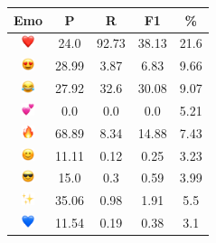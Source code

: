 \documentclass{article}
\begin{document}
\begin{table}
\centering
\begin{tabular}{|c|ccc|c|} \hline
\textbf{Emo} & \textbf{P} & \textbf{R} & \textbf{F1} & \textbf{\%} \\ \hline
\includegraphics[height=0.37cm,width=0.37cm]{img/red_heart.png} & 24.0 & 92.73 & 38.13 & 21.6\\ 
\includegraphics[height=0.37cm,width=0.37cm]{img/smiling_face_with_hearteyes.png} & 28.99 & 3.87 & 6.83 & 9.66\\ 
\includegraphics[height=0.37cm,width=0.37cm]{img/face_with_tears_of_joy.png} & 27.92 & 32.6 & 30.08 & 9.07\\ 
\includegraphics[height=0.37cm,width=0.37cm]{img/two_hearts.png} & 0.0 & 0.0 & 0.0 & 5.21\\ 
\includegraphics[height=0.37cm,width=0.37cm]{img/fire.png} & 68.89 & 8.34 & 14.88 & 7.43\\ 
\includegraphics[height=0.37cm,width=0.37cm]{img/smiling_face_with_smiling_eyes.png} & 11.11 & 0.12 & 0.25 & 3.23\\ 
\includegraphics[height=0.37cm,width=0.37cm]{img/smiling_face_with_sunglasses.png} & 15.0 & 0.3 & 0.59 & 3.99\\ 
\includegraphics[height=0.37cm,width=0.37cm]{img/sparkles.png} & 35.06 & 0.98 & 1.91 & 5.5\\ 
\includegraphics[height=0.37cm,width=0.37cm]{img/blue_heart.png} & 11.54 & 0.19 & 0.38 & 3.1\\ 

\end{tabular}
\end{table}
\end{document}
